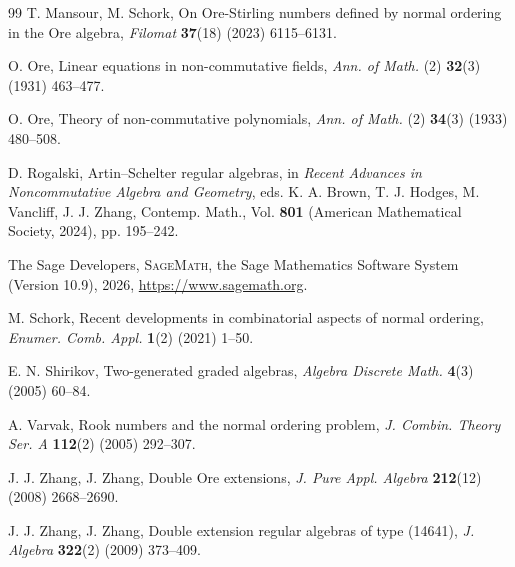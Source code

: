 \documentclass{amsart}
\theoremstyle{definition}
\theoremstyle{remark}
\numberwithin{equation}{section}
\begin{document}
\begin{thebibliography}{99}
T. Mansour, M. Schork, On Ore-Stirling numbers defined by normal ordering in the Ore algebra,
{\em Filomat} \textbf{37}(18) (2023) 6115--6131.

O. Ore, Linear equations in non-commutative fields,
{\em Ann. of Math.} (2) \textbf{32}(3) (1931) 463--477.

O. Ore, Theory of non-commutative polynomials,
{\em Ann. of Math.} (2) \textbf{34}(3) (1933) 480--508.

D. Rogalski, Artin--Schelter regular algebras, in {\em Recent Advances in Noncommutative Algebra and Geometry},
eds. K. A. Brown, T. J. Hodges, M. Vancliff, J. J. Zhang,
Contemp. Math., Vol. \textbf{801} (American Mathematical Society, 2024), pp. 195--242.

The Sage Developers, \textsc{SageMath}, the Sage Mathematics Software System (Version 10.9), 2026, \url{https://www.sagemath.org}.

M. Schork, Recent developments in combinatorial aspects of normal ordering,
{\em Enumer. Comb. Appl.} \textbf{1}(2) (2021) 1--50.

E. N. Shirikov, Two-generated graded algebras,
{\em Algebra Discrete Math.} \textbf{4}(3) (2005) 60--84.

A. Varvak, Rook numbers and the normal ordering problem,
{\em J. Combin. Theory Ser. A} \textbf{112}(2) (2005) 292--307.

J. J. Zhang, J. Zhang, Double Ore extensions,
{\em J. Pure Appl. Algebra} \textbf{212}(12) (2008) 2668--2690.

J. J. Zhang, J. Zhang, Double extension regular algebras of type (14641),
{\em J. Algebra} \textbf{322}(2) (2009) 373--409.

\end{thebibliography}
\end{document}
